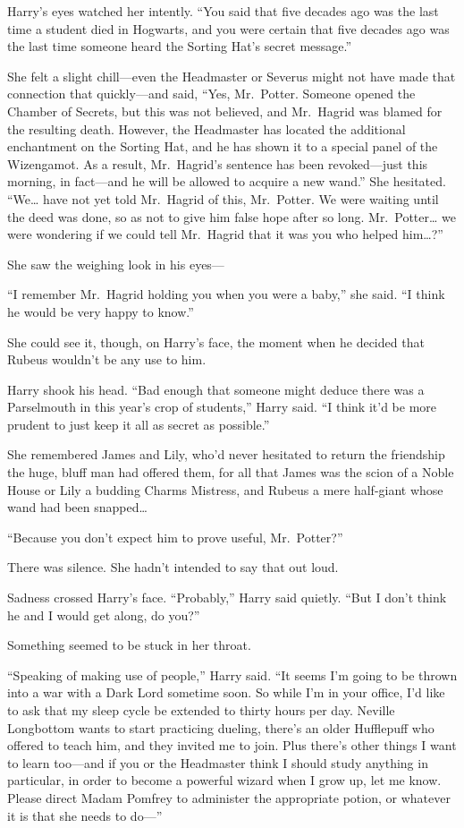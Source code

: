 Harry's eyes watched her intently. ``You said that five decades ago was
the last time a student died in Hogwarts, and you were certain that five
decades ago was the last time someone heard the Sorting Hat's secret
message.''

She felt a slight chill---even the Headmaster or Severus might not have
made that connection that quickly---and said, ``Yes, Mr.~Potter. Someone
opened the Chamber of Secrets, but this was not believed, and Mr.~Hagrid
was blamed for the resulting death. However, the Headmaster has located
the additional enchantment on the Sorting Hat, and he has shown it to a
special panel of the Wizengamot. As a result, Mr.~Hagrid's sentence has
been revoked---just this morning, in fact---and he will be allowed to
acquire a new wand.'' She hesitated. ``We\ldots{} have not yet told
Mr.~Hagrid of this, Mr.~Potter. We were waiting until the deed was done,
so as not to give him false hope after so long. Mr.~Potter\ldots{} we
were wondering if we could tell Mr.~Hagrid that it was you who helped
him\ldots{}?''

She saw the weighing look in his eyes---

``I remember Mr.~Hagrid holding you when you were a baby,'' she said.
``I think he would be very happy to know.''

She could see it, though, on Harry's face, the moment when he decided
that Rubeus wouldn't be any use to him.

Harry shook his head. ``Bad enough that someone might deduce there was a
Parselmouth in this year's crop of students,'' Harry said. ``I think
it'd be more prudent to just keep it all as secret as possible.''

She remembered James and Lily, who'd never hesitated to return the
friendship the huge, bluff man had offered them, for all that James was
the scion of a Noble House or Lily a budding Charms Mistress, and Rubeus
a mere half-giant whose wand had been snapped\ldots{}

``Because you don't expect him to prove useful, Mr.~Potter?''

There was silence. She hadn't intended to say that out loud.

Sadness crossed Harry's face. ``Probably,'' Harry said quietly. ``But I
don't think he and I would get along, do you?''

Something seemed to be stuck in her throat.

``Speaking of making use of people,'' Harry said. ``It seems I'm going
to be thrown into a war with a Dark Lord sometime soon. So while I'm in
your office, I'd like to ask that my sleep cycle be extended to thirty
hours per day. Neville Longbottom wants to start practicing dueling,
there's an older Hufflepuff who offered to teach him, and they invited
me to join. Plus there's other things I want to learn too---and if you
or the Headmaster think I should study anything in particular, in order
to become a powerful wizard when I grow up, let me know. Please direct
Madam Pomfrey to administer the appropriate potion, or whatever it is
that she needs to do---''

